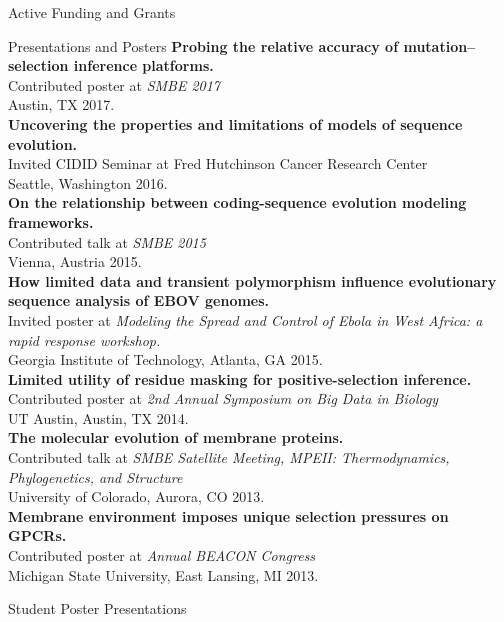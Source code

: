\documentclass{resume} %
\begin{document}
\begin{rSection}{Active Funding and Grants}
\begin{rSection}{Presentations and Posters}
\textbf{Probing the relative accuracy of mutation--selection inference platforms.}
\\Contributed poster at \emph{SMBE 2017}
\\ Austin, TX 2017.\\

\textbf{Uncovering the properties and limitations of models of sequence evolution.}
\\Invited CIDID Seminar at Fred Hutchinson Cancer Research Center
\\ Seattle, Washington 2016.\\

\textbf{On the relationship between coding-sequence evolution modeling frameworks.}
\\Contributed talk at \emph{SMBE 2015}
\\ Vienna, Austria 2015.\\

\textbf{How limited data and transient polymorphism influence evolutionary sequence analysis of EBOV genomes.}
\\Invited poster at \emph{Modeling the Spread and Control of Ebola in West Africa: a rapid response workshop.}
\\ Georgia Institute of Technology, Atlanta, GA 2015.\\

\textbf{Limited utility of residue masking for positive-selection inference.}
\\Contributed poster at \emph{2nd Annual Symposium on Big Data in Biology}
\\ UT Austin, Austin, TX 2014.\\

\textbf{The molecular evolution of membrane proteins.}
\\Contributed talk at \emph{SMBE Satellite Meeting, MPEII: Thermodynamics, Phylogenetics, and Structure}
\\ University of Colorado, Aurora, CO 2013.\\

\textbf{Membrane environment imposes unique selection pressures on GPCRs.}
\\Contributed poster at \emph{Annual BEACON Congress}
\\ Michigan State University, East Lansing, MI 2013.


\end{rSection}


\vspace*{0.5cm}
\begin{rSection}{Student Poster Presentations}
\vspace*{0.25cm}


\end{rSection}
\end{rSection}
\end{document}
